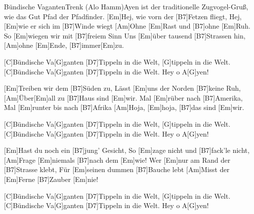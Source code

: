 \documentclass[../main.tex]{subfiles}
\begin{document}
\begin{song}{Bündische Vaganten}{Trenk (Alo Hamm)}{\glqq Ayen\grqq{} ist der traditionelle Zugvogel-Gruß, wie das \glqq Gut Pfad\grqq{} der Pfadfinder.}
[Em]Hej, wie vorn der [B7]Fetzen fliegt,
Hej, [Em]wie er sich im [B7]Winde wiegt
[Am]Ohne [Em]Rast und [B7]ohne [Em]Ruh.
So [Em]wiegen wir mit [B7]freiem Sinn
Uns [Em]{ü}ber tausend [B7]Strassen hin,
[Am]ohne [Em]Ende, [B7]immer[Em]zu.

[C]Bündische Va[G]ganten
[D7]Tippeln in die Welt, [G]tippeln in die Welt.
[C]Bündische Va[G]ganten
[D7]Tippeln in die Welt. Hey o A[G]yen!

[Em]Treiben wir dem [B7]Süden zu,
Lässt [Em]uns der Norden [B7]keine Ruh,
[Am]{Ü}ber[Em]all zu [B7]Haus sind [Em]wir.
Mal [Em]rüber nach [B7]Amerika,
Mal [Em]runter bis nach [B7]Afrika
[Am]Hoja, [Em]hoja, [B7]das sind [Em]wir.

[C]Bündische Va[G]ganten
[D7]Tippeln in die Welt, [G]tippeln in die Welt.
[C]Bündische Va[G]ganten
[D7]Tippeln in die Welt. Hey o A[G]yen!

[Em]Hast du noch ein [B7]jung' Gesicht,
So [Em]zage nicht und [B7]fack'le nicht,
[Am]Frage [Em]niemals [B7]nach dem [Em]wie!
Wer [Em]nur am Rand der [B7]Strasse klebt,
Für [Em]seinen dummen [B7]Bauche lebt
[Am]Misst der [Em]Ferne [B7]Zauber [Em]nie!

[C]Bündische Va[G]ganten
[D7]Tippeln in die Welt, [G]tippeln in die Welt.
[C]Bündische Va[G]ganten
[D7]Tippeln in die Welt. Hey o A[G]yen!

\end{song}
\end{document}
